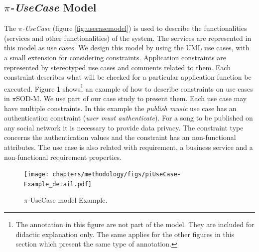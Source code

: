 \subsection{\textit{$\pi$-UseCase} Model}


The \textit{$\pi$-UseCase} (figure \ref{fig:usecasemodel}) is used
to describe the functionalities (services and other functionalities) of the system. The
services are represented in this model as use cases. We design this model by
using the UML use cases, with a small extension for considering constraints.
Application constraints are represented by stereotyped use cases and comments
related to them. Each constraint describes what will be checked for a
particular application function be executed. Figure \ref{fig:piUseCaseExample}
shows\footnote{The annotation in this figure are not part of
the model. They are included for didactic explanation only. The same applies for
the other figures in this section which present the same type of annotation.} an
example of how to describe constraints on use cases in $\pi$SOD-M. We use part
of our case study to present them. Each use case may have multiple constraints.
In this example the \textit{publish music} use case has an authentication
constraint (\textit{user must authenticate}). For a song to be published on any
social network it is necessary to provide data privacy. The constraint type
concerns the authentication values and the constraint has an non-functional
attributes. The use case is also related with requirement, a business service
and a non-functional requirement properties.
 


\begin{figure}[ht!] 
\centering
\texttt{[image: chapters/methodology/figs/piUseCase-Example\_detail.pdf]}
\caption{$\pi$-UseCase model Example.}
\label{fig:piUseCaseExample} 
\end{figure}

%  
 
